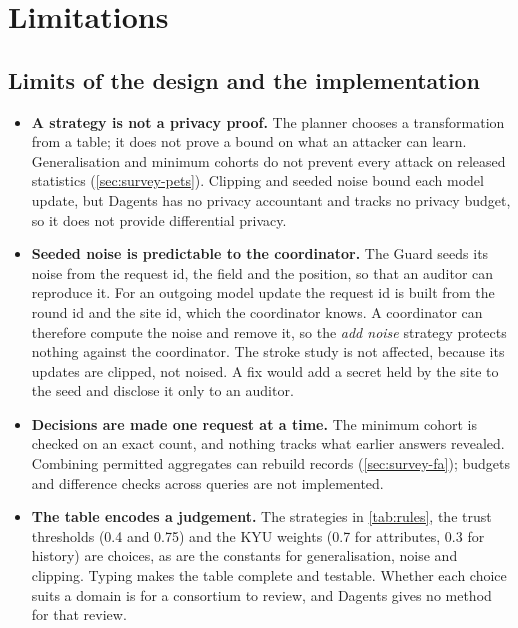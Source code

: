 \section{Limitations}
\label{sec:limitations}

\subsection{Limits of the design and the implementation}

\begin{itemize}
  \item \textbf{A strategy is not a privacy proof.} The planner chooses a
        transformation from a table; it does not prove a bound on what an
        attacker can learn. Generalisation and minimum cohorts do not prevent
        every attack on released statistics (\cref{sec:survey-pets}). Clipping
        and seeded noise bound each model update, but Dagents has no privacy
        accountant and tracks no privacy budget, so it does not provide
        differential privacy.
  \item \textbf{Seeded noise is predictable to the coordinator.} The Guard seeds
        its noise from the request id, the field and the position, so that an
        auditor can reproduce it. For an outgoing model update the request id is
        built from the round id and the site id, which the coordinator knows. A
        coordinator can therefore compute the noise and remove it, so the
        \emph{add noise} strategy protects nothing against the coordinator. The
        stroke study is not affected, because its updates are clipped, not
        noised. A fix would add a secret held by the site to the seed and
        disclose it only to an auditor.
  \item \textbf{Decisions are made one request at a time.} The minimum cohort
        is checked on an exact count, and nothing tracks what earlier answers
        revealed. Combining permitted aggregates can rebuild records
        (\cref{sec:survey-fa}); budgets and difference checks across queries
        are not implemented.
  \item \textbf{The table encodes a judgement.} The strategies in
        \cref{tab:rules}, the trust thresholds (0.4 and 0.75) and the KYU
        weights (0.7 for attributes, 0.3 for history) are choices, as are the
        constants for generalisation, noise and clipping. Typing makes the table
        complete and testable. Whether each choice suits a domain is for a
        consortium to review, and Dagents gives no method for that review.

\end{itemize}
